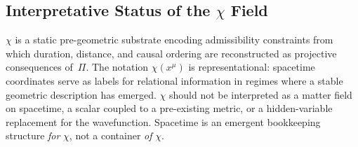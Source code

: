 \subsection{Interpretative Status of the
\texorpdfstring{$\chi$}{χ} Field}
  \label{subsec:nature-chi}

  $\chi$ is a static pre-geometric substrate encoding admissibility constraints
  from which duration, distance, and causal ordering are reconstructed as
  projective consequences of~$\Pi$.
  The notation $\chi(x^\mu)$ is representational: spacetime coordinates
  serve as labels for relational information in regimes where a stable
  geometric description has emerged.
  $\chi$ should not be interpreted as a matter field on spacetime, a
  scalar coupled to a pre-existing metric, or a hidden-variable
  replacement for the wavefunction.
  Spacetime is an emergent bookkeeping structure \emph{for} $\chi$, not
  a container \emph{of} $\chi$.
